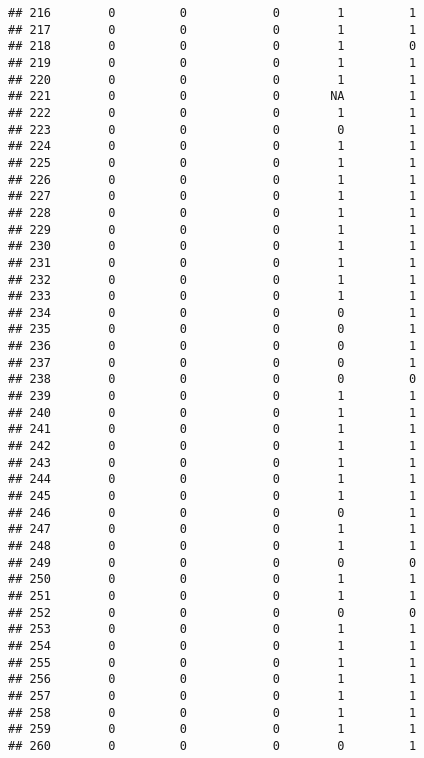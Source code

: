 \documentclass[
]{article}
\begin{document}
\begin{verbatim}
## 216        0         0            0        1         1
## 217        0         0            0        1         1
## 218        0         0            0        1         0
## 219        0         0            0        1         1
## 220        0         0            0        1         1
## 221        0         0            0       NA         1
## 222        0         0            0        1         1
## 223        0         0            0        0         1
## 224        0         0            0        1         1
## 225        0         0            0        1         1
## 226        0         0            0        1         1
## 227        0         0            0        1         1
## 228        0         0            0        1         1
## 229        0         0            0        1         1
## 230        0         0            0        1         1
## 231        0         0            0        1         1
## 232        0         0            0        1         1
## 233        0         0            0        1         1
## 234        0         0            0        0         1
## 235        0         0            0        0         1
## 236        0         0            0        0         1
## 237        0         0            0        0         1
## 238        0         0            0        0         0
## 239        0         0            0        1         1
## 240        0         0            0        1         1
## 241        0         0            0        1         1
## 242        0         0            0        1         1
## 243        0         0            0        1         1
## 244        0         0            0        1         1
## 245        0         0            0        1         1
## 246        0         0            0        0         1
## 247        0         0            0        1         1
## 248        0         0            0        1         1
## 249        0         0            0        0         0
## 250        0         0            0        1         1
## 251        0         0            0        1         1
## 252        0         0            0        0         0
## 253        0         0            0        1         1
## 254        0         0            0        1         1
## 255        0         0            0        1         1
## 256        0         0            0        1         1
## 257        0         0            0        1         1
## 258        0         0            0        1         1
## 259        0         0            0        1         1
## 260        0         0            0        0         1

\end{verbatim}
\end{document}
